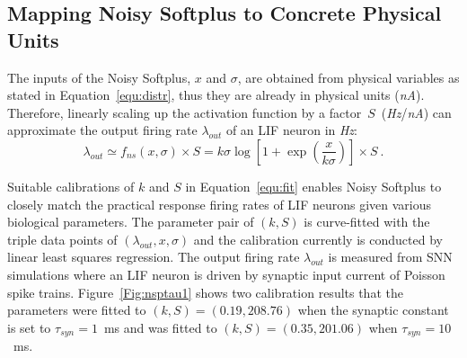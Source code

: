 \documentclass{article}
\begin{document}
\subsection{Mapping Noisy Softplus to Concrete Physical Units}
\label{sec:af_model}
The inputs of the Noisy Softplus, $x$ and $\sigma$, are obtained from physical variables as stated in Equation~\ref{equ:distr}, thus they are already in physical units (\textit{nA}).
Therefore, linearly scaling up the activation function by a factor~$S$~(\textit{Hz}/\textit{nA}) can approximate the output firing rate $\lambda_{out}$ of an LIF neuron in \textit{Hz}:
\begin{equation}
\lambda_{out} \simeq f_{ns}(x, \sigma) \times S = k \sigma \log [1 + \exp(\frac{x}{k \sigma})] \times S~.
\label{equ:fit}
\end{equation}	


Suitable calibrations of $k$ and $S$ in Equation~\ref{equ:fit} enables Noisy Softplus to closely match the practical response firing rates of LIF neurons given various biological parameters.
The parameter pair of $(k, S)$ is curve-fitted with the triple data points of $(\lambda_{out}, x, \sigma)$ and the calibration currently is conducted by linear least squares regression.
The output firing rate $\lambda_{out}$ is measured from SNN simulations where an LIF neuron is driven by synaptic input current of Poisson spike trains.
Figure~\ref{Fig:nsptau1} shows two calibration results that 
the parameters were fitted to $(k, S)=(0.19,208.76)$ when the synaptic constant is set to $\tau_{syn}=1$~ms and was fitted to $(k, S)=(0.35,201.06)$ when $\tau_{syn}=10$~ms.
\end{document}
